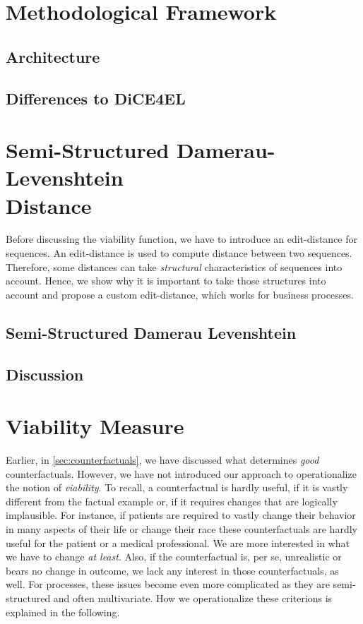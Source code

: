 \documentclass[12pt,a4paper]{report}
\begin{document}
\section{Methodological Framework}
\label{sec:framework}
\subsection{Architecture}


\subsection{Differences to DiCE4EL}


\section{Semi-Structured Damerau-Levenshtein \\ Distance}
\label{sec:ssdld}
Before discussing the viability function, we have to introduce an edit-distance for sequences. An edit-distance is used to compute distance between two sequences. Therefore, some distances can take \emph{structural} characteristics of sequences into account. Hence, we show why it is important to take those structures into account and propose a custom edit-distance, which works for business processes.


\subsection{Semi-Structured Damerau Levenshtein}


\subsection{Discussion}


\section{Viability Measure}
\label{sec:viability}
Earlier, in \autoref{sec:counterfactuals}, we have discussed what determines \emph{good} counterfactuals. However, we have not introduced our approach to operationalize the notion of \emph{viability}. To recall, a counterfactual is hardly useful, if it is vastly different from the factual example or, if it requires changes that are logically implausible. For instance, if patients are required to vastly change their behavior in many aspects of their life or change their race these counterfactuals are hardly useful for the patient or a medical professional. We are more interested in what we have to change \emph{at least}. Also, if the counterfactual is, per se, unrealistic or bears no change in outcome, we lack any interest in those counterfactuals, as well. For processes, these issues become even more complicated as they are semi-structured and often multivariate. How we operationalize these criterions is explained in the following.
\end{document}
